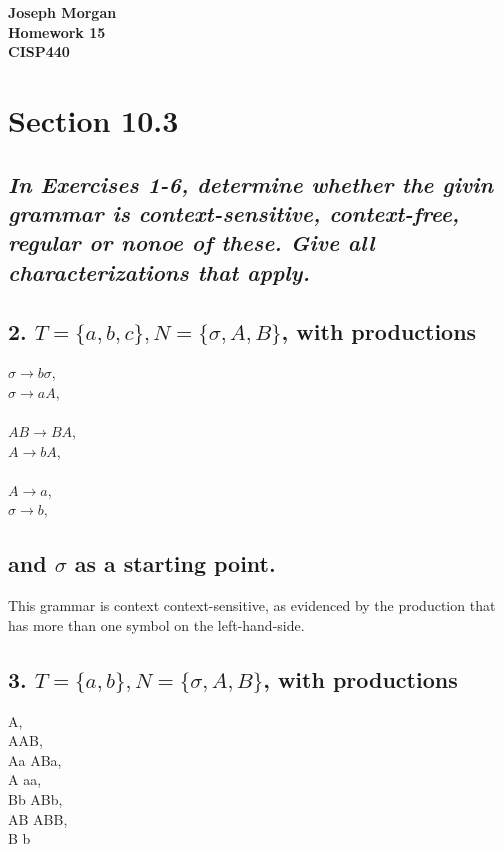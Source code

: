 \documentclass[12pt,titlepage]{article}
\begin{document}
\begin{titlepage}
	\centering
	\vfill
	{\bfseries\Large
		Joseph Morgan\\
		\large
		Homework 15\\
		\vskip2cm
		CISP440\\
	}
	\vfill
	\vfill
	\vfill
\end{titlepage}
\section*{Section 10.3}
\subsection*{\textit{In Exercises 1-6, determine whether the givin grammar is
context-sensitive, context-free, regular or nonoe of these. Give all
characterizations that apply.}}
\subsection*{2. $T = \{a, b, c\}, N = \{\sigma, A, B\}$, with productions}
\begin{multicols}{3}
	$\sigma \rightarrow b\sigma$,\\
	$\sigma \rightarrow aA$,\\
	\columnbreak\\
	$AB \rightarrow BA$,\\
	$A \rightarrow bA$,\\
	\columnbreak\\
	$A \rightarrow a$,\\
	$\sigma \rightarrow b$,\\
\end{multicols}
\subsection*{and $\sigma$ as a starting point.}
This grammar is context context-sensitive, as evidenced by the production that
has more than one symbol on the left-hand-side.
\subsection*{3. $T = \{a, b\}, N = \{\sigma, A, B\}$, with productions}
\begin{multicols}{3}
	\sigma \rightarrow A,\\
	\sigma \rightarrow AAB,\\
	Aa \rightarrow ABa,
	\columnbreak\\
	A \rightarrow aa,\\
	Bb \rightarrow ABb,
	\columnbreak\\
	AB \rightarrow ABB,\\
	B \rightarrow b
\end{multicols}
\end{document}

